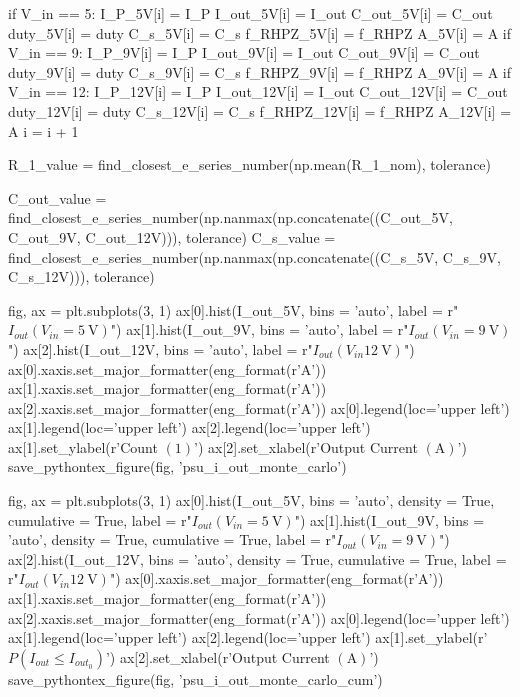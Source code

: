 \documentclass[12pt, titlepage]{tex-template}
\begin{document}
\begin{pycode}
        if V_in == 5:
            I_P_5V[i] = I_P
            I_out_5V[i] = I_out
            C_out_5V[i] = C_out
            duty_5V[i] = duty
            C_s_5V[i] = C_s
            f_RHPZ_5V[i] = f_RHPZ
            A_5V[i] = A
        if V_in == 9:
            I_P_9V[i] = I_P
            I_out_9V[i] = I_out
            C_out_9V[i] = C_out
            duty_9V[i] = duty
            C_s_9V[i] = C_s
            f_RHPZ_9V[i] = f_RHPZ
            A_9V[i] = A
        if V_in == 12:
            I_P_12V[i] = I_P
            I_out_12V[i] = I_out
            C_out_12V[i] = C_out
            duty_12V[i] = duty
            C_s_12V[i] = C_s
            f_RHPZ_12V[i] = f_RHPZ
            A_12V[i] = A
    i = i + 1

R_1_value = find_closest_e_series_number(np.mean(R_1_nom), tolerance)

C_out_value = find_closest_e_series_number(np.nanmax(np.concatenate((C_out_5V, C_out_9V, C_out_12V))), tolerance)
C_s_value = find_closest_e_series_number(np.nanmax(np.concatenate((C_s_5V, C_s_9V, C_s_12V))), tolerance)

fig, ax = plt.subplots(3, 1)
ax[0].hist(I_out_5V, bins = 'auto', label = r"$I_{out}(V_{in}=\SI{5}{\volt})$")
ax[1].hist(I_out_9V, bins = 'auto', label = r"$I_{out}(V_{in}=\SI{9}{\volt})$")
ax[2].hist(I_out_12V, bins = 'auto', label = r"$I_{out}(V_{in}\SI{12}{\volt})$")
ax[0].xaxis.set_major_formatter(eng_format(r'\unit{\ampere}'))
ax[1].xaxis.set_major_formatter(eng_format(r'\unit{\ampere}'))
ax[2].xaxis.set_major_formatter(eng_format(r'\unit{\ampere}'))
ax[0].legend(loc='upper left')
ax[1].legend(loc='upper left')
ax[2].legend(loc='upper left')
ax[1].set_ylabel(r'Count $\left(1\right)$')
ax[2].set_xlabel(r'Output Current $\left(\unit{\ampere}\right)$')
save_pythontex_figure(fig, 'psu_i_out_monte_carlo')

fig, ax = plt.subplots(3, 1)
ax[0].hist(I_out_5V, bins = 'auto', density = True, cumulative = True, label = r"$I_{out}(V_{in}=\SI{5}{\volt})$")
ax[1].hist(I_out_9V, bins = 'auto', density = True, cumulative = True, label = r"$I_{out}(V_{in}=\SI{9}{\volt})$")
ax[2].hist(I_out_12V, bins = 'auto', density = True, cumulative = True, label = r"$I_{out}(V_{in}\SI{12}{\volt})$")
ax[0].xaxis.set_major_formatter(eng_format(r'\unit{\ampere}'))
ax[1].xaxis.set_major_formatter(eng_format(r'\unit{\ampere}'))
ax[2].xaxis.set_major_formatter(eng_format(r'\unit{\ampere}'))
ax[0].legend(loc='upper left')
ax[1].legend(loc='upper left')
ax[2].legend(loc='upper left')
ax[1].set_ylabel(r'$P\left(I_{out} \leq I_{out_0}\right)$')
ax[2].set_xlabel(r'Output Current $\left(\unit{\ampere}\right)$')
save_pythontex_figure(fig, 'psu_i_out_monte_carlo_cum')


\end{pycode}
\end{document}
